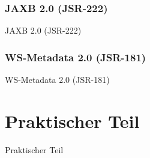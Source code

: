 \documentclass[ucs]{beamer}
\begin{document}
  \subsubsection{JAXB 2.0 (JSR-222)}
  \begin{frame}{JAXB 2.0 (JSR-222)}
  \end{frame}

  \subsubsection{WS-Metadata 2.0 (JSR-181)}
  \begin{frame}{WS-Metadata 2.0 (JSR-181)}
  \end{frame}


  \section{Praktischer Teil}
  \begin{frame}{Praktischer Teil}
  \end{frame}
\end{document}
